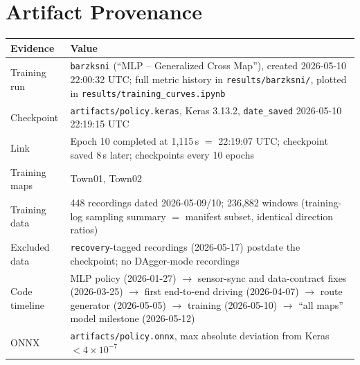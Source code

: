 \documentclass[11pt]{article}
\begin{document}
\appendix
\section{Artifact Provenance}
\label{app:provenance}

{\small\noindent\begin{tabularx}{\linewidth}{@{}l X@{}}
    \toprule
    Evidence & Value \\
    \midrule
    Training run & \texttt{barzksni} (``MLP -- Generalized Cross Map''), created 2026-05-10 22:00:32 UTC; full metric history in \texttt{results/barzksni/}, plotted in \texttt{results/training\_curves.ipynb} \\
    Checkpoint & \texttt{artifacts/policy.keras}, Keras 3.13.2, \texttt{date\_saved} 2026-05-10 22:19:15 UTC \\
    Link & Epoch 10 completed at 1,115\,s $=$ 22:19:07 UTC; checkpoint saved 8\,s later; checkpoints every 10 epochs \\
    Training maps & Town01, Town02 \\
    Training data & 448 recordings dated 2026-05-09/10; 236,882 windows (training-log sampling summary $=$ manifest subset, identical direction ratios) \\
    Excluded data & \texttt{recovery}-tagged recordings (2026-05-17) postdate the checkpoint; no DAgger-mode recordings \\
    Code timeline & MLP policy (2026-01-27) $\rightarrow$ sensor-sync and data-contract fixes (2026-03-25) $\rightarrow$ first end-to-end driving (2026-04-07) $\rightarrow$ route generator (2026-05-05) $\rightarrow$ training (2026-05-10) $\rightarrow$ ``all maps'' model milestone (2026-05-12) \\
    ONNX & \texttt{artifacts/policy.onnx}, max absolute deviation from Keras $< 4\times10^{-7}$ \\
    \bottomrule
  \end{tabularx}\par}
\end{document}
